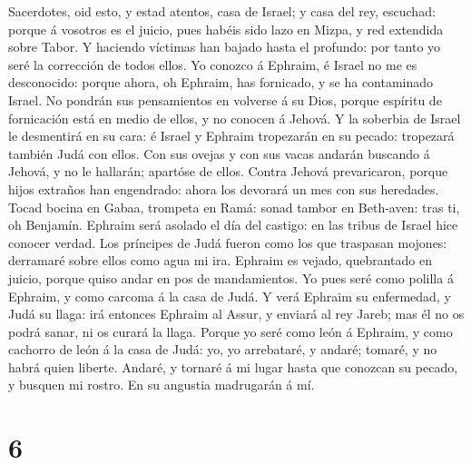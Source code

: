  Sacerdotes, oid esto, y estad atentos, casa de Israel; y
casa del rey, escuchad: porque á vosotros es el juicio, pues habéis sido
lazo en Mizpa, y red extendida sobre Tabor.  Y haciendo
víctimas han bajado hasta el profundo: por tanto yo seré la corrección
de todos ellos.  Yo conozco á Ephraim, é Israel no me es
desconocido: porque ahora, oh Ephraim, has fornicado, y se ha
contaminado Israel.  No pondrán sus pensamientos en
volverse á su Dios, porque espíritu de fornicación está en medio de
ellos, y no conocen á Jehová.  Y la soberbia de Israel le
desmentirá en su cara: é Israel y Ephraim tropezarán en su pecado:
tropezará también Judá con ellos.  Con sus ovejas y con
sus vacas andarán buscando á Jehová, y no le hallarán; apartóse de
ellos.  Contra Jehová prevaricaron, porque hijos extraños
han engendrado: ahora los devorará un mes con sus heredades.
 Tocad bocina en Gabaa, trompeta en Ramá: sonad tambor en
Beth-aven: tras ti, oh Benjamín.  Ephraim será asolado el
día del castigo: en las tribus de Israel hice conocer verdad.
 Los príncipes de Judá fueron como los que traspasan
mojones: derramaré sobre ellos como agua mi ira.  Ephraim
es vejado, quebrantado en juicio, porque quiso andar en pos de
mandamientos.  Yo pues seré como polilla á Ephraim, y
como carcoma á la casa de Judá.  Y verá Ephraim su
enfermedad, y Judá su llaga: irá entonces Ephraim al Assur, y enviará al
rey Jareb; mas él no os podrá sanar, ni os curará la llaga.
 Porque yo seré como león á Ephraim, y como cachorro de
león á la casa de Judá: yo, yo arrebataré, y andaré; tomaré, y no habrá
quien liberte.  Andaré, y tornaré á mi lugar hasta que
conozcan su pecado, y busquen mi rostro. En su angustia madrugarán á mí.

\hypertarget{section-5}{%
\section{6}\label{section-5}}


